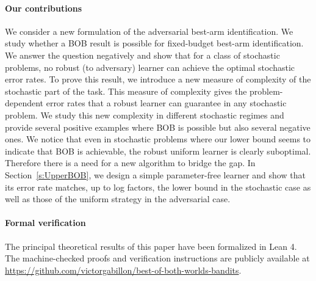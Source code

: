 \paragraph{Our contributions}
We consider a new 
formulation of the adversarial 
best-arm identification. 
We study whether 
a BOB result is possible for fixed-budget best-arm
identification. We answer the question negatively and show that for a class of stochastic problems,
no robust (to adversary) learner can achieve the optimal stochastic error rates.
To prove this result, we introduce a new measure of complexity of the 
stochastic part of the task. This measure of complexity gives the 
problem-dependent error rates that a robust learner
can guarantee in any stochastic problem. 
We study
this new complexity in different stochastic regimes and provide several 
positive examples where BOB is possible but also several negative ones. 
We notice that even in stochastic problems where our lower bound seems 
to indicate that BOB is achievable, the robust uniform learner is clearly suboptimal.
Therefore there is a need for a
new algorithm to bridge the gap.  In Section~\ref{s:UpperBOB}, we
design a simple parameter-free learner and show that its error rate matches, up to log
factors, the lower bound in the stochastic case
as well as those of the uniform strategy in the adversarial case.  
%
%
\paragraph{Formal verification}
The principal theoretical results of this paper have been formalized in Lean 4.
The machine-checked proofs and verification instructions are publicly available
at \url{https://github.com/victorgabillon/best-of-both-worlds-bandits}.

